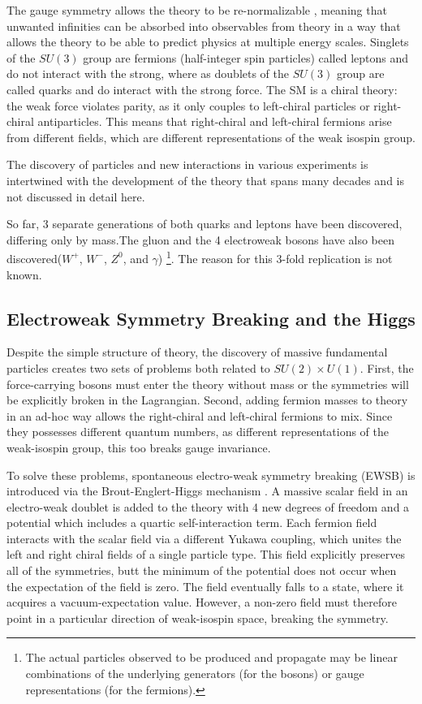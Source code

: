 The gauge symmetry allows the theory to be
re-normalizable \cite{1972.tHooft-Veltman.regularization_and_renormalization}, meaning that unwanted infinities can be absorbed into
observables from theory in a way that allows the theory to be able to predict
physics at multiple energy scales.  Singlets of the $SU(3)$ group are fermions
(half-integer spin particles) called leptons and do not interact with the strong, where as
doublets of the $SU(3)$ group are called quarks and do interact with the strong force. The SM is a chiral theory:
the weak force violates parity, as it only couples to left-chiral particles or
right-chiral antiparticles. This means that right-chiral and
left-chiral fermions arise from different fields, which are
different representations of the weak isospin group.
 

The discovery of particles and new interactions in various experiments
is intertwined with the development of the theory that spans many
decades and is not discussed in detail here. 

So far, 3 separate generations of both quarks and leptons have been discovered,
differing only by mass.The gluon and the 4 electroweak bosons have also been
discovered($W^+$, $W^-$, $Z^0$, and $\gamma$) \footnote{The actual particles
observed to be produced and propagate may be linear combinations of the
underlying generators (for the bosons) or gauge representations (for the
fermions).}.  The reason for this 3-fold replication is not known. 




\subsection{Electroweak Symmetry Breaking and the Higgs}

Despite the simple structure of theory, the discovery of massive fundamental
particles creates two sets of problems both related to $SU(2) \times U(1)$. First, the force-carrying bosons must enter the theory
without mass or the symmetries will be explicitly broken in the Lagrangian. Second, adding
fermion masses to theory in an ad-hoc way allows the right-chiral and
left-chiral fermions to mix. Since they possesses different quantum numbers, as
different representations of the weak-isospin group, this too breaks gauge
invariance. 

To solve these problems, spontaneous electro-weak symmetry breaking (EWSB) is
introduced via the Brout-Englert-Higgs mechanism \cite{Higgs:1964pj, Higgs:1966ev,Englert:1964et}. A  massive scalar field
in an electro-weak doublet is added to the theory with 4 new
degrees of freedom and a potential which includes a 
quartic self-interaction term. Each fermion field interacts with the scalar field via
a different Yukawa coupling, which unites the left and right chiral fields
of a single particle type.  This field
explicitly preserves all of the symmetries, butt the minimum of the potential does not
occur when the expectation of the field is zero. The field
eventually falls to a state, where it acquires a vacuum-expectation
value. However, a non-zero field must therefore point in a
particular direction of weak-isospin space, breaking the symmetry.

